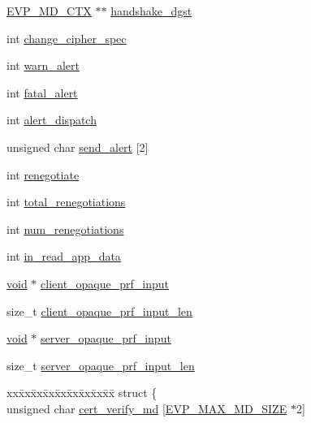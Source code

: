 \begin{DoxyCompactItemize}
\item 
\hyperlink{crypto_2ossl__typ_8h_a69cda4d21bd068f01c469222c1dd92fe}{E\+V\+P\+\_\+\+M\+D\+\_\+\+C\+TX} $\ast$$\ast$ \hyperlink{structssl3__state__st_a3368952ef0749399a7435b7a40958911}{handshake\+\_\+dgst}
\item 
int \hyperlink{structssl3__state__st_a75583b0e81eef245e1120b02b9c9637a}{change\+\_\+cipher\+\_\+spec}
\item 
int \hyperlink{structssl3__state__st_a1925c46f6da50e425ead2b2131a5cd1a}{warn\+\_\+alert}
\item 
int \hyperlink{structssl3__state__st_a62c12d1af0e73bf5fc44d5c3b7efadbc}{fatal\+\_\+alert}
\item 
int \hyperlink{structssl3__state__st_add346ed3dd343e6b492c26ba63efa4b3}{alert\+\_\+dispatch}
\item 
unsigned char \hyperlink{structssl3__state__st_adad9706506f147269ec2a6df6bc3f2d6}{send\+\_\+alert} \mbox{[}2\mbox{]}
\item 
int \hyperlink{structssl3__state__st_a33239609244fa68ad9876fb8a7c05917}{renegotiate}
\item 
int \hyperlink{structssl3__state__st_a395a483dcab32f83b8f2da7744adb25b}{total\+\_\+renegotiations}
\item 
int \hyperlink{structssl3__state__st_ad243d30df1c6e3af8c56dd089cb767f8}{num\+\_\+renegotiations}
\item 
int \hyperlink{structssl3__state__st_a48ce60f27169c668977c3335c78246d3}{in\+\_\+read\+\_\+app\+\_\+data}
\item 
\hyperlink{hw__4758__cca_8h_afad4d591c7931ff6dc5bf69c76c96aa0}{void} $\ast$ \hyperlink{structssl3__state__st_a7eec379ffa6ef580c8d7dd408a77805c}{client\+\_\+opaque\+\_\+prf\+\_\+input}
\item 
size\+\_\+t \hyperlink{structssl3__state__st_acb05ec65851375e8d4dcb829ecfdec77}{client\+\_\+opaque\+\_\+prf\+\_\+input\+\_\+len}
\item 
\hyperlink{hw__4758__cca_8h_afad4d591c7931ff6dc5bf69c76c96aa0}{void} $\ast$ \hyperlink{structssl3__state__st_ac0eb8f7a69df226fc0ea3e84238511e4}{server\+\_\+opaque\+\_\+prf\+\_\+input}
\item 
size\+\_\+t \hyperlink{structssl3__state__st_a72f80b3d92f496e924b36217ca22958d}{server\+\_\+opaque\+\_\+prf\+\_\+input\+\_\+len}
\item 
\begin{tabbing}
xx\=xx\=xx\=xx\=xx\=xx\=xx\=xx\=xx\=\kill
struct \{\\
\>unsigned char \hyperlink{structssl3__state__st_ac58d45d751e6687c540d670d319034ad}{cert\_verify\_md} \mbox{[}\hyperlink{include_2openssl_2evp_8h_a71bfc78a168f00f0c4ffd2535082b129}{EVP\_MAX\_MD\_SIZE} $\ast$2\mbox{]}\\

\end{tabbing}$$
\end{DoxyCompactItemize}
